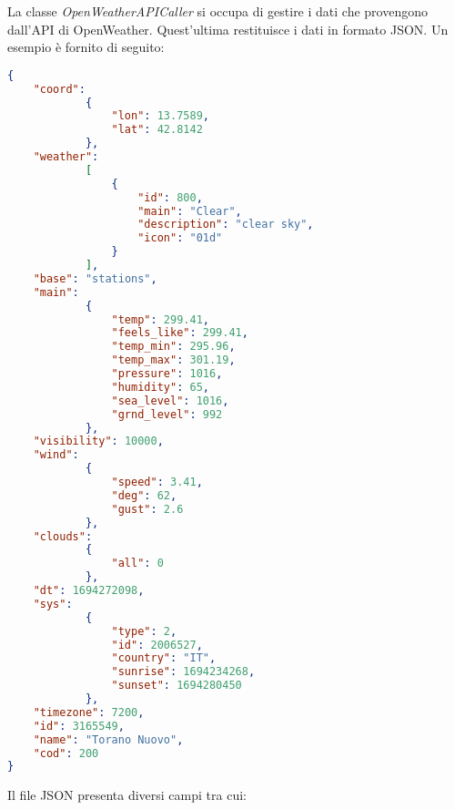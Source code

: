 La classe \textit{OpenWeatherAPICaller} si occupa di gestire i dati che provengono dall'API di OpenWeather. Quest'ultima restituisce i dati in formato JSON. Un esempio è fornito di seguito:

\begin{lstlisting}[language=json]
{
    "coord":
            {
                "lon": 13.7589,
                "lat": 42.8142
            },
    "weather":
            [
                {
                    "id": 800,
                    "main": "Clear",
                    "description": "clear sky",
                    "icon": "01d"
                }
            ],
    "base": "stations",
    "main":
            {
                "temp": 299.41,
                "feels_like": 299.41,
                "temp_min": 295.96,
                "temp_max": 301.19,
                "pressure": 1016,
                "humidity": 65,
                "sea_level": 1016,
                "grnd_level": 992
            },
    "visibility": 10000,
    "wind":
            {
                "speed": 3.41,
                "deg": 62,
                "gust": 2.6
            },
    "clouds":
            {
                "all": 0
            },
    "dt": 1694272098,
    "sys":
            {
                "type": 2,
                "id": 2006527,
                "country": "IT",
                "sunrise": 1694234268,
                "sunset": 1694280450
            },
    "timezone": 7200,
    "id": 3165549,
    "name": "Torano Nuovo",
    "cod": 200
} 
\end{lstlisting}

Il file JSON presenta diversi campi tra cui:

